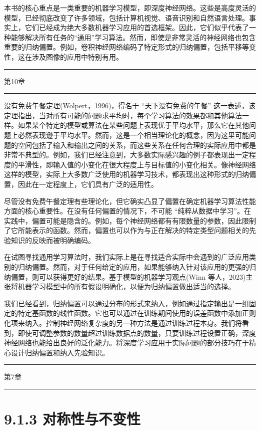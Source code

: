 \documentclass[10pt]{report}
\newcommand{\HRule}{\begin{center}\rule{0.9\linewidth}{0.2mm}\end{center}}
\begin{document}
本书的核心重点是一类重要的机器学习模型，即深度神经网络。这些是高度灵活的模型，已经彻底改变了许多领域，包括计算机视觉、语音识别和自然语言处理。事实上，它们已经成为绝大多数机器学习应用的首选框架。因此，它们似乎代表了一种能够解决所有任务的“通用”学习算法。然而，即使是非常灵活的神经网络也包含重要的归纳偏置。例如，卷积神经网络编码了特定形式的归纳偏置，包括平移等变性，这在涉及图像的应用中特别有用。

\HRule

第10章

\HRule

没有免费午餐定理(Wolpert，1996)，得名于 “天下没有免费的午餐” 这一表述，该定理指出，当对所有可能的问题求平均时，每个学习算法的效果都和其他算法一样。如果某个特定的模型或算法在某些问题上表现优于平均水平，那么它在其他问题上必然表现逊于平均水平。然而，这是一个相当理论化的概念，因为这里可能问题的空间包括了输入和输出之间的关系，而这些关系在任何合理的实际应用中都是非常不典型的。例如，我们已经注意到，大多数实际感兴趣的例子都表现出一定程度的平滑性，即输入值的小变化在很大程度上与目标值的小变化相关。像神经网络这样的模型，实际上大多数广泛使用的机器学习技术，都表现出这种形式的归纳偏置，因此在一定程度上，它们具有广泛的适用性。

尽管没有免费午餐定理有些理论化，但它确实凸显了偏置在确定机器学习算法性能方面的核心重要性。在没有任何偏置的情况下，不可能 “纯粹从数据中学习”。在实践中，偏置可能是隐含的。例如，每个神经网络都有有限数量的参数，因此限制了它所能表示的函数。然而，偏置也可以作为与正在解决的特定类型问题相关的先验知识的反映而被明确编码。

在试图寻找通用学习算法时，我们实际上是在寻找适合实际中会遇到的广泛应用类别的归纳偏置。然而，对于任何给定的应用，如果能够纳入针对该应用的更强的归纳偏置，则可以获得更好的结果。基于模型的机器学习观点(Winn 等人，2023)主张将机器学习模型中的所有假设明确化，以便为归纳偏置做出适当的选择。

我们已经看到，归纳偏置可以通过分布的形式来纳入，例如通过指定输出是一组固定的特定基函数的线性函数。它也可以通过在训练期间使用的误差函数中添加正则化项来纳入。控制神经网络复杂度的另一种方法是通过训练过程本身。我们将看到，即使可调整参数的数量超过训练数据点的数量，只要训练过程设置正确，深度神经网络也能给出良好的泛化能力。将深度学习应用于实际问题的部分技巧在于精心设计归纳偏置和纳入先验知识。

\HRule

第7章

\HRule

\section*{9.1.3 对称性与不变性}
\end{document}
